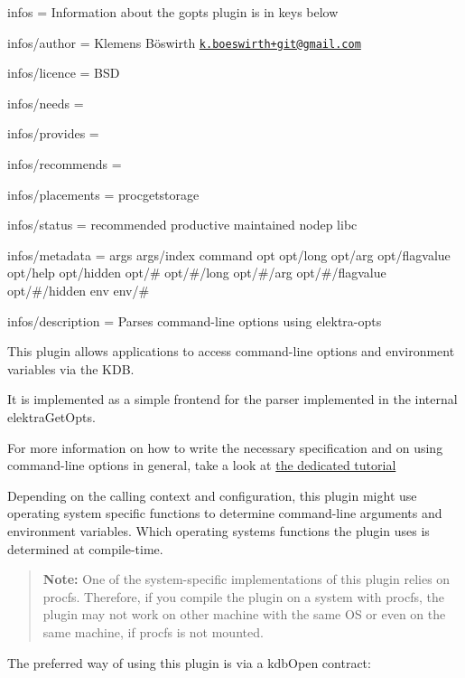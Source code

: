 
\begin{DoxyItemize}
\item infos = Information about the gopts plugin is in keys below
\item infos/author = Klemens Böswirth \href{mailto:k.boeswirth+git@gmail.com}{\tt k.\+boeswirth+git@gmail.\+com}
\item infos/licence = B\+SD
\item infos/needs =
\item infos/provides =
\item infos/recommends =
\item infos/placements = procgetstorage
\item infos/status = recommended productive maintained nodep libc
\item infos/metadata = args args/index command opt opt/long opt/arg opt/flagvalue opt/help opt/hidden opt/\# opt/\#/long opt/\#/arg opt/\#/flagvalue opt/\#/hidden env env/\#
\item infos/description = Parses command-\/line options using elektra-\/opts
\end{DoxyItemize}

This plugin allows applications to access command-\/line options and environment variables via the K\+DB.

It is implemented as a simple frontend for the parser implemented in the internal {\ttfamily elektra\+Get\+Opts}.

For more information on how to write the necessary specification and on using command-\/line options in general, take a look at \hyperlink{doc_tutorials_command-line-options_md}{the dedicated tutorial}

Depending on the calling context and configuration, this plugin might use operating system specific functions to determine command-\/line arguments and environment variables. Which operating system\textquotesingle{}s functions the plugin uses is determined at compile-\/time.

\begin{quote}
{\bfseries Note\+:} One of the system-\/specific implementations of this plugin relies on procfs. Therefore, if you compile the plugin on a system with procfs, the plugin may not work on other machine with the same OS or even on the same machine, if procfs is not mounted. \end{quote}


The preferred way of using this plugin is via a {\ttfamily kdb\+Open} contract\+:


